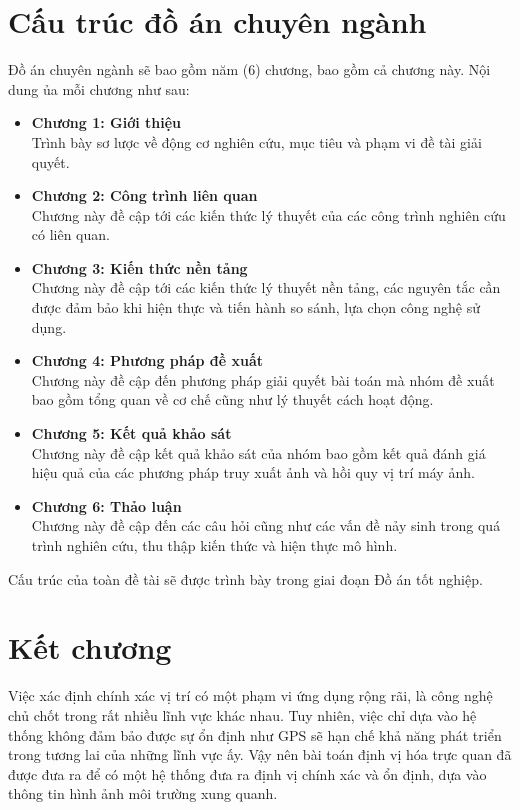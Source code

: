 \section{Cấu trúc đồ án chuyên ngành}
Đồ án chuyên ngành sẽ bao gồm năm (6) chương, bao gồm cả chương này. Nội dung ủa mỗi chương như sau:
\begin{itemize}
    \item \textbf{Chương 1: Giới thiệu} \\
    Trình bày sơ lược về động cơ nghiên cứu, mục tiêu và phạm vi đề tài giải quyết.
    \item \textbf{Chương 2: Công trình liên quan} \\
    Chương này đề cập tới các kiến thức lý thuyết của các công trình nghiên cứu có liên quan.
    \item \textbf{Chương 3: Kiến thức nền tảng} \\
    Chương này đề cập tới các kiến thức lý thuyết nền tảng, các nguyên tắc cần được đảm bảo khi hiện thực và tiến hành so sánh, lựa chọn công nghệ sử dụng.
    \item \textbf{Chương 4: Phương pháp đề xuất} \\
    Chương này đề cập đến phương pháp giải quyết bài toán mà nhóm đề xuất bao gồm tổng quan về cơ chế cũng như lý thuyết cách hoạt động.
    \item \textbf{Chương 5: Kết quả khảo sát} \\
    Chương này đề cập kết quả khảo sát của nhóm bao gồm kết quả đánh giá hiệu quả của các phương pháp truy xuất ảnh và hồi quy vị trí máy ảnh.
    \item \textbf{Chương 6: Thảo luận} \\
    Chương này đề cập đến các câu hỏi cũng như các vấn đề nảy sinh trong quá trình nghiên cứu, thu thập kiến thức và hiện thực mô hình.
\end{itemize}
Cấu trúc của toàn đề tài sẽ được trình bày trong giai đoạn Đồ án tốt nghiệp.

\section{Kết chương}
Việc xác định chính xác vị trí có một phạm vi ứng dụng rộng rãi, là công nghệ chủ chốt trong rất nhiều lĩnh vực khác nhau. Tuy nhiên, việc chỉ dựa vào hệ thống không đảm bảo được sự ổn định như GPS sẽ hạn chế khả năng phát triển trong tương lai của những lĩnh vực ấy. Vậy nên bài toán định vị hóa trực quan đã được đưa ra để có một hệ thống đưa ra định vị chính xác và ổn định, dựa vào thông tin hình ảnh môi trường xung quanh.

